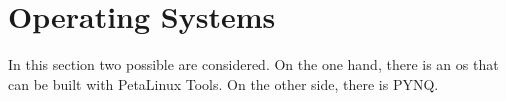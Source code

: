 \section{Operating Systems}
\label{sec:embedded_platform:operating_systems}

In this section two possible  are considered.
On the one hand, there is an \acrshort{os} that can be built with PetaLinux Tools.
On the other side, there is PYNQ.




